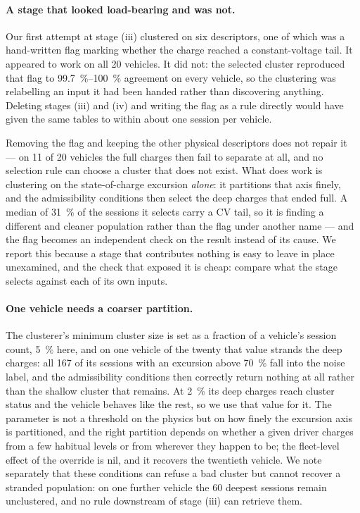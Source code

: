\documentclass[preprint,3p,number]{elsarticle}
\begin{document}
\paragraph{A stage that looked load-bearing and was not.} Our first attempt at
stage (iii) clustered on six descriptors, one of which was a hand-written flag
marking whether the charge reached a constant-voltage tail. It appeared to work
on all \num{20} vehicles. It did not: the selected cluster reproduced that flag
to \SIrange{99.7}{100}{\percent} agreement on every vehicle, so the clustering
was relabelling an input it had been handed rather than discovering anything.
Deleting stages (iii) and (iv) and writing the flag as a rule directly would
have given the same tables to within about one session per vehicle.

Removing the flag and keeping the other physical descriptors does not repair it
--- on \num{11} of \num{20} vehicles the full charges then fail to separate at
all, and no selection rule can choose a cluster that does not exist. What does
work is clustering on the state-of-charge excursion \emph{alone}: it partitions
that axis finely, and the admissibility conditions then select the deep charges
that ended full. A median of \SI{31}{\percent} of the sessions it selects carry
a CV tail, so it is finding a different and cleaner population rather than the
flag under another name --- and the flag becomes an independent check on the
result instead of its cause. We report this because a stage that contributes
nothing is easy to leave in place unexamined, and the check that exposed it is
cheap: compare what the stage selects against each of its own inputs.

\paragraph{One vehicle needs a coarser partition.} The clusterer's minimum
cluster size is set as a fraction of a vehicle's session count, \SI{5}{\percent}
here, and on one vehicle of the twenty that value strands the deep charges: all
\num{167} of its sessions with an excursion above \SI{70}{\percent} fall into
the noise label, and the admissibility conditions then correctly return nothing
at all rather than the shallow cluster that remains. At \SI{2}{\percent} its
deep charges reach cluster status and the vehicle behaves like the rest, so we
use that value for it. The parameter is not a threshold on the physics but on
how finely the excursion axis is partitioned, and the right partition depends on
whether a given driver charges from a few habitual levels or from wherever they
happen to be; the fleet-level effect of the override is nil, and it recovers the
twentieth vehicle. We note separately that these conditions can refuse a bad
cluster but cannot recover a stranded population: on one further vehicle the
\num{60} deepest sessions remain unclustered, and no rule downstream of stage
(iii) can retrieve them.
\end{document}
